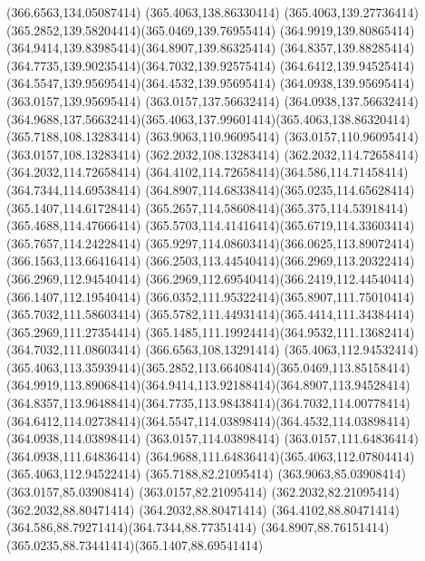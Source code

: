 {{	\lineto(366.6563,134.05087414)
	\closepath
	\moveto(365.4063,138.86330414)
	\curveto(365.4063,139.27736414)(365.2852,139.58204414)(365.0469,139.76955414)
	\curveto(364.9919,139.80865414)(364.9414,139.83985414)(364.8907,139.86325414)
	\curveto(364.8357,139.88285414)(364.7735,139.90235414)(364.7032,139.92575414)
	\curveto(364.6412,139.94525414)(364.5547,139.95695414)(364.4532,139.95695414)
	\lineto(364.0938,139.95695414)
	\lineto(363.0157,139.95695414)
	\lineto(363.0157,137.56632414)
	\lineto(364.0938,137.56632414)
	\curveto(364.9688,137.56632414)(365.4063,137.99601414)(365.4063,138.86320414)
	\closepath
	\moveto(365.7188,108.13283414)
	\lineto(363.9063,110.96095414)
	\lineto(363.0157,110.96095414)
	\lineto(363.0157,108.13283414)
	\lineto(362.2032,108.13283414)
	\lineto(362.2032,114.72658414)
	\lineto(364.2032,114.72658414)
	\curveto(364.4102,114.72658414)(364.586,114.71458414)(364.7344,114.69538414)
	\curveto(364.8907,114.68338414)(365.0235,114.65628414)(365.1407,114.61728414)
	\curveto(365.2657,114.58608414)(365.375,114.53918414)(365.4688,114.47666414)
	\curveto(365.5703,114.41416414)(365.6719,114.33603414)(365.7657,114.24228414)
	\curveto(365.9297,114.08603414)(366.0625,113.89072414)(366.1563,113.66416414)
	\curveto(366.2503,113.44540414)(366.2969,113.20322414)(366.2969,112.94540414)
	\curveto(366.2969,112.69540414)(366.2419,112.44540414)(366.1407,112.19540414)
	\curveto(366.0352,111.95322414)(365.8907,111.75010414)(365.7032,111.58603414)
	\curveto(365.5782,111.44931414)(365.4414,111.34384414)(365.2969,111.27354414)
	\curveto(365.1485,111.19924414)(364.9532,111.13682414)(364.7032,111.08603414)
	\lineto(366.6563,108.13291414)
	\closepath
	\moveto(365.4063,112.94532414)
	\curveto(365.4063,113.35939414)(365.2852,113.66408414)(365.0469,113.85158414)
	\curveto(364.9919,113.89068414)(364.9414,113.92188414)(364.8907,113.94528414)
	\curveto(364.8357,113.96488414)(364.7735,113.98438414)(364.7032,114.00778414)
	\curveto(364.6412,114.02738414)(364.5547,114.03898414)(364.4532,114.03898414)
	\lineto(364.0938,114.03898414)
	\lineto(363.0157,114.03898414)
	\lineto(363.0157,111.64836414)
	\lineto(364.0938,111.64836414)
	\curveto(364.9688,111.64836414)(365.4063,112.07804414)(365.4063,112.94522414)
	\closepath
	\moveto(365.7188,82.21095414)
	\lineto(363.9063,85.03908414)
	\lineto(363.0157,85.03908414)
	\lineto(363.0157,82.21095414)
	\lineto(362.2032,82.21095414)
	\lineto(362.2032,88.80471414)
	\lineto(364.2032,88.80471414)
	\curveto(364.4102,88.80471414)(364.586,88.79271414)(364.7344,88.77351414)
	\curveto(364.8907,88.76151414)(365.0235,88.73441414)(365.1407,88.69541414)
}}
